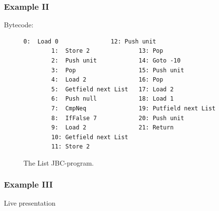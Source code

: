 \documentclass{beamer}
\begin{document}
\begin{frame}[fragile]
        \frametitle{\textbf{Example II}}
        \begin{block}{Bytecode:}
                \begin{figure}[h!]
		\centering
                \begin{lstlisting}[numbers=none,basicstyle=\scriptsize\ttfamily]
		0:  Load 0               12: Push unit
		1:  Store 2              13: Pop
		2:  Push unit            14: Goto -10
		3:  Pop                  15: Push unit
		4:  Load 2               16: Pop
		5:  Getfield next List   17: Load 2
		6:  Push null            18: Load 1
		7:  CmpNeq               19: Putfield next List
		8:  IfFalse 7            20: Push unit
		9:  Load 2               21: Return
		10: Getfield next List
		11: Store 2
		\end{lstlisting}
	        \caption{The List JBC-program.}
	        \label{fig:list-jbc}
                \end{figure}
        \end{block}
\end{frame}

\begin{frame}
        \frametitle{\textbf{Example III}}
        \begin{block}{}
	\begin{center}
	Live presentation
	\end{center}
        \end{block}
\end{frame}

\end{document}
